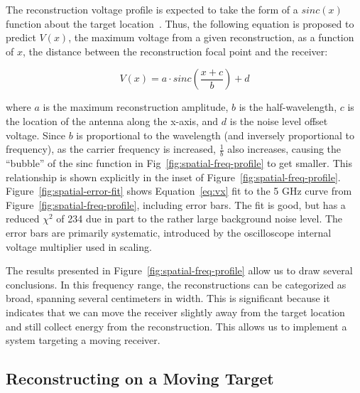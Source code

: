 The reconstruction \ptp{} voltage profile is expected to take the form of a $sinc(x)$ function about the target location~\cite{lerosey-focusing}. Thus, the following equation is proposed to predict $V(x)$, the maximum \ptp{} voltage from a given reconstruction, as a function of $x$, the distance between the reconstruction focal point and the receiver:

\begin{equation}
\label{eq:vx}
V(x) = a\cdot sinc\left(\frac{x+c}{b}\right) + d
\end{equation}

where $a$ is the maximum \ptp{} reconstruction amplitude, $b$ is the half-wavelength, $c$ is the location of the antenna along the x-axis, and $d$ is the noise level
offset voltage. Since $b$ is proportional to the wavelength (and inversely proportional
to frequency), as the carrier frequency is increased,  $\frac{1}{b}$ also increases, causing the ``bubble'' of the sinc function in Fig~\ref{fig:spatial-freq-profile} to get smaller. This relationship is shown explicitly in the inset of Figure~\ref{fig:spatial-freq-profile}. Figure~\ref{fig:spatial-error-fit} shows Equation~\ref{eq:vx} fit to the 5 GHz curve from Figure~\ref{fig:spatial-freq-profile}, including error bars. The fit is good, but has a reduced $\chi^2$ of 234 due in part to the rather large background noise level. The error bars are primarily systematic, introduced by the oscilloscope internal voltage multiplier used in scaling.


The results presented in Figure~\ref{fig:spatial-freq-profile} allow us to draw several conclusions. In this frequency range, the reconstructions can be categorized as broad, spanning several centimeters in width. This is significant because it indicates that we can move the receiver slightly away from the target location and still collect energy from the reconstruction. This allows us to implement a system targeting a moving receiver.

\subsection{Reconstructing on a Moving Target}
\label{sec:recon-moving}

